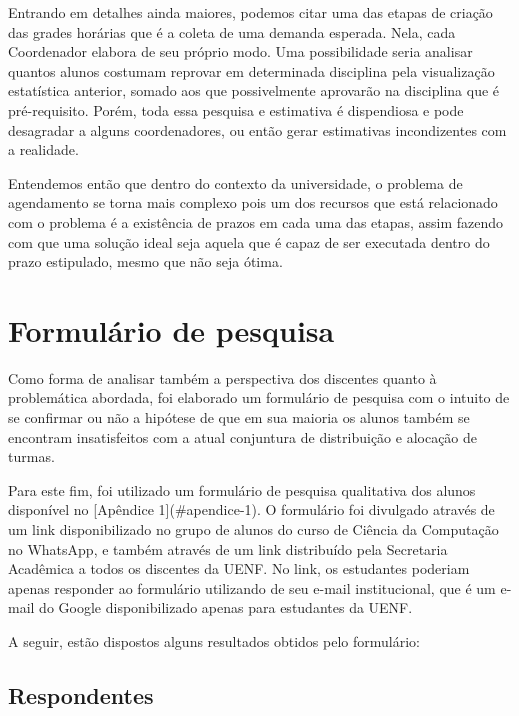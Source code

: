     Entrando em detalhes ainda maiores, podemos citar uma das etapas de criação das grades horárias que é a coleta de uma demanda esperada. Nela, cada Coordenador elabora de seu próprio modo. Uma possibilidade seria analisar quantos alunos costumam reprovar em determinada disciplina pela visualização estatística anterior, somado aos que possivelmente aprovarão na disciplina que é pré-requisito. Porém, toda essa pesquisa e estimativa é dispendiosa e pode desagradar a alguns coordenadores, ou então gerar estimativas incondizentes com a realidade.

    Entendemos então que dentro do contexto da universidade, o problema de agendamento se torna mais complexo pois um dos recursos que está relacionado com o problema é a existência de prazos em cada uma das etapas, assim fazendo com que uma solução ideal seja aquela que é capaz de ser executada dentro do prazo estipulado, mesmo que não seja ótima.

\section{Formulário de pesquisa} %


    Como forma de analisar também a perspectiva dos discentes quanto à problemática abordada, foi elaborado um formulário de pesquisa com o intuito de se confirmar ou não a hipótese de que em sua maioria os alunos também se encontram insatisfeitos com a atual conjuntura de distribuição e alocação de turmas.

    Para este fim, foi utilizado um formulário de pesquisa qualitativa dos alunos disponível no [Apêndice 1](#apendice-1). O formulário foi divulgado através de um link disponibilizado no grupo de alunos do curso de Ciência da Computação no WhatsApp, e também através de um link distribuído pela Secretaria Acadêmica a todos os discentes da UENF. No link, os estudantes poderiam apenas responder ao formulário utilizando de seu e-mail institucional, que é um e-mail do Google disponibilizado apenas para estudantes da UENF.

    A seguir, estão dispostos alguns resultados obtidos pelo formulário:


    \subsection{Respondentes} %

